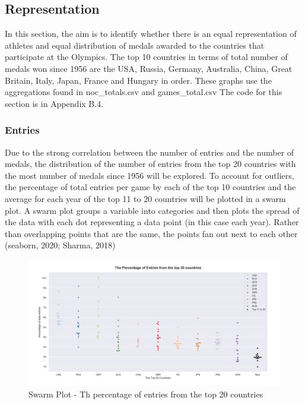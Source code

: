 \documentclass[a4 paper, 12pt]{article}
\begin{document}
    \subsection{Representation}
    In this section, the aim is to identify whether there is an equal representation of athletes and equal distribution of medals awarded to the countries that participate at the Olympics. The top 10 countries in terms of total number of medals won since 1956 are the USA, Russia, Germany, Australia, China, Great Britain, Italy, Japan, France and Hungary in order. These graphs use the aggregations found in noc\_totals.csv and games\_total.csv The code for this section is in Appendix B.4.

        \subsubsection{Entries}
        Due to the strong correlation between the number of entries and the number of medals, the distribution of the number of entries from the top 20 countries with the most number of medals since 1956 will be explored. To account for outliers, the percentage of total entries per game by each of the top 10 countries and the average for each year of the top 11 to 20 countries will be plotted in a swarm plot. A swarm plot groups a variable into categories and then plots the spread of the data with each dot representing a data point (in this case each year). Rather than overlapping points that are the same, the points fan out next to each other (seaborn, 2020; Sharma, 2018)

        \begin{figure} [H]
            \centering
            \includegraphics[width=\textwidth, frame]
                {./images/graph/countries_entryperc_swarm.png}      
                \caption{Swarm Plot - Th percentage of entries from the top 20 countries} 
        \end{figure}
\end{document}
